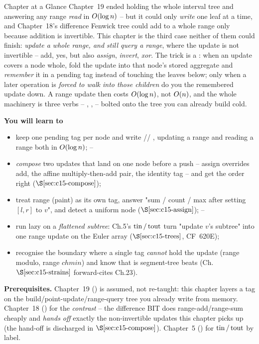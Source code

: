 \begin{chaptertheorybox}{Chapter at a Glance}
Chapter~19 ended holding the whole interval tree and answering any range
\emph{read} in \(O(\log n)\) -- but it could only \emph{write} one leaf at a
time, and Chapter~18's difference Fenwick tree could add to a whole range only
because addition is invertible.  This chapter is the third case neither of them
could finish: \emph{update a whole range, and still query a range}, where the
update is not invertible -- add, yes, but also \emph{assign}, \emph{invert},
\emph{xor}.  The trick is a : when an update covers a node whole,
fold the update into that node's stored aggregate and \emph{remember} it in a
pending tag instead of touching the leaves below; only when a later operation is
\emph{forced to walk into those children} do you  the remembered
update down.  A range update then costs \(O(\log n)\), not \(O(n)\), and
the whole machinery is three verbs -- , ,  --
bolted onto the tree you can already build cold.

\textbf{You will learn to}
\begin{itemize}[nosep]
  \item keep one pending tag per node and write //
        , updating a range and reading a range both in
        \(O(\log n)\); \hfill{}--
  \item \emph{compose} two updates that land on one node before a push --
        assign overrides add, the affine multiply-then-add pair, the identity
        tag -- and get the order right (\(\secref{c15-compose}\)); \hfill{}
  \item treat range  (paint) as its own tag, answer "sum / count /
        max after setting \([l,r]\) to \(v\)", and detect a uniform node
        (\(\secref{c15-assign}\)); \hfill{}--
  \item run lazy on a \emph{flattened subtree}: Ch.5's \(\operatorname{tin}/\operatorname{tout}\) turn
        "update \(v\)'s subtree" into one range update on the Euler array
        (\(\secref{c15-trees}\), CF~620E); \hfill{}
  \item recognise the boundary where a single tag \emph{cannot} hold the update
        (range modulo, range \(\mathit{chmin}\)) and know that is segment-tree
        beats (Ch.~\(\secref{c15-strains}\) forward-cites Ch.23). \hfill{}
\end{itemize}

\textbf{Prerequisites.} Chapter~19 () is assumed, not re-taught: this
chapter layers a tag on the build/point-update/range-query tree you already
write from memory.  Chapter~18 () for the \emph{contrast} -- the
difference BIT does range-add/range-sum cheaply and \emph{hands off} exactly the
non-invertible updates this chapter picks up (the hand-off is discharged in
\(\secref{c15-compose}\)).  Chapter~5 () for \(\operatorname{tin}/\operatorname{tout}\) by label.
\end{chaptertheorybox}

